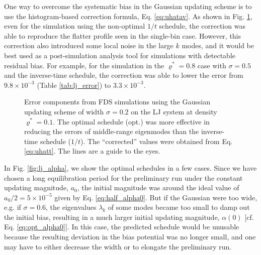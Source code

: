 \documentclass[preprint, superscriptaddress, floatfix]{revtex4-1}
\begin{document}
One way to overcome the systematic bias
in the Gaussian updating scheme
is to use the histogram-based correction formula,
Eq. \eqref{eq:uhatav}.
%
As shown in Fig. \ref{fig:lj_xerr},
even for the simulation using the non-optimal $1/t$ schedule,
the correction was able to reproduce
the flatter profile seen in the single-bin case.
%
However, this correction also introduced
some local noise in the large $k$ modes,
and it would be best used as a post-simulation
analysis tool for simulations
with detectable residual bias.
%
For example, for the simulation in the $\varrho^* = 0.8$ case
with $\sigma = 0.5$ and the inverse-time schedule,
the correction was able to lower
the error from $9.8\times10^{-3}$
(Table \ref{tab:lj_error}) to $3.3\times10^{-3}$.


\begin{figure}[h]
\begin{center}
  \caption{
    \label{fig:lj_xerr}
    Error components from FDS simulations
    using the Gaussian updating scheme
    of width $\sigma = 0.2$
    on the LJ system at density $\varrho^* = 0.1$.
    The optimal schedule (opt.) was more effective
    in reducing the errors of middle-range eigenmodes
    than the inverse-time schedule ($1/t$).
    The ``corrected'' values were obtained from
    Eq. \eqref{eq:uhatt}.
    The lines are a guide to the eyes.
  }
\end{center}
\end{figure}

In Fig. \ref{fig:lj_alpha},
we show the optimal schedules in a few cases.
%
%
Since we have chosen a long equilibration period
for the preliminary run under the constant updating magnitude, $a_0$,
the initial magnitude was around
the ideal value of $a_0/2 = 5\times10^{-5}$
given by Eq. \eqref{eq:half_alpha0}.
%
But if the Gaussian were too wide,
e.g. if $\sigma = 0.6$,
the eigenvalues $\lambda_k$ of some modes
became too small to damp out the initial bias,
resulting in a much larger initial updating magnitude, $\alpha(0)$
[cf. Eq. \eqref{eq:opt_alpha0}].
%
In this case, the predicted schedule
would be unusable because the resulting deviation in the bias potential
was no longer small,
and one may have to either decrease the width
or to elongate the preliminary run.
\end{document}
